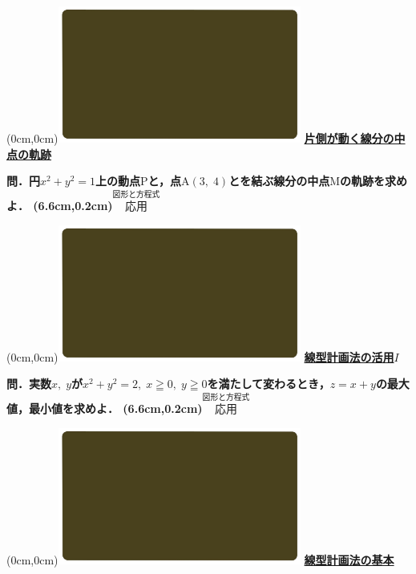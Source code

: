 \documentclass[10pt,
fleqn,
dvipdfmx,
uplatex
]{jsarticle}
\begin{document}
\at(0cm,0cm){\includegraphics[width=8cm,bb=0 0 1920 1080]{./youtube/thumbnails/templates/smart_background/図形と方程式.jpeg}}
{\color{orange}\bf\boldmath\Large\underline{片側が動く線分の中点の軌跡}}\vspace{0.3zw}

\LARGE 
\bf\boldmath 問．円$x^2+y^2=1$上の動点$\text{P}$と，点$\text{A}\left(3,\;4\right)$とを結ぶ線分の中点$\text{M}$の軌跡を求めよ．
\at(6.6cm,0.2cm){\small\color{bradorange}$\overset{\text{図形と方程式}}{\text{応用}}$}


\newpage



\at(0cm,0cm){\includegraphics[width=8cm,bb=0 0 1920 1080]{./youtube/thumbnails/templates/smart_background/図形と方程式.jpeg}}
{\color{orange}\bf\boldmath\huge\underline{線型計画法の活用$I$}}\vspace{0.3zw}

\LARGE 
\bf\boldmath 問．実数$x,\;y$が$x^2+y^2=2,\;x\geqq 0,\;y\geqq 0$を満たして変わるとき，$z=x+y$の最大値，最小値を求めよ．
\at(6.6cm,0.2cm){\small\color{bradorange}$\overset{\text{図形と方程式}}{\text{応用}}$}


\newpage



\at(0cm,0cm){\includegraphics[width=8cm,bb=0 0 1920 1080]{./youtube/thumbnails/templates/smart_background/図形と方程式.jpeg}}
{\color{orange}\bf\boldmath\huge\underline{線型計画法の基本}}\vspace{0.3zw}
\end{document}
